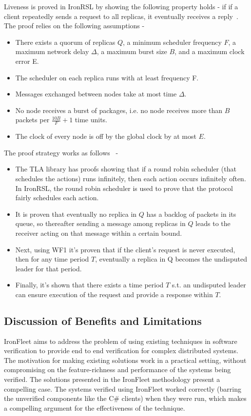 \documentclass{llncs}
\begin{document}
Liveness is proved in IronRSL by showing the following property holds - if if a client repeatedly
sends a request to all replicas, it eventually receives
a reply~\cite{ironfleet}. The proof relies on the following assumptions - 
\begin{itemize} 
    \item There exists a quorum of replicas $Q$, a
        minimum scheduler frequency $F$, a maximum network delay
        $\Delta$, a maximum burst size $B$, and a maximum clock error E.
    \item The scheduler on each replica runs with at least frequency F.
    \item Messages exchanged between nodes take at most time $\Delta$.
    \item No node receives a burst of packages, i.e. no node receives more
          than $B$ packets per $\frac{10B}{F} + 1$ time units.
    \item The clock of every node is off by the global clock by at most $E$.
\end{itemize}

The proof strategy works as follows~\cite{ironfleet} - 
\begin{itemize}
    \item The TLA library has proofs showing that if a round robin scheduler (that 
        schedules the actions) runs infinitely, then each action occurs
        infinitely often. In IronRSL, the round robin scheduler is used to prove that
        the protocol fairly schedules each action.
    \item It is proven that eventually no replica in $Q$ 
        has a backlog of packets in its queue, so
        thereafter sending a message among replicas in $Q$ leads to
        the receiver acting on that message within a certain bound.
    \item Next, using WF1 it's proven that if the client’s request
        is never executed, then for any time period $T$, eventually a
        replica in Q becomes the undisputed leader for that period.
    \item Finally, it's shown that there exists a time period $T$ s.t. 
        an undisputed leader can ensure execution of the request and 
        provide a response within $T$.
\end{itemize}

\subsection{Discussion of Benefits and Limitations}
IronFleet aims to address the problem of using existing techniques in software verification
to provide end to end verification for complex distributed systems. The motivation for 
making existing solutions work in a practical setting, without compromising on the
feature-richness and performance of the systems being verified. The solutions presented in the IronFleet
methodology present a compelling case. The systems verified using IronFleet worked correctly (barring
the unverified components like the C\# clients)
when they were run, which makes a compelling argument for the effectiveness of the technique.
\end{document}
